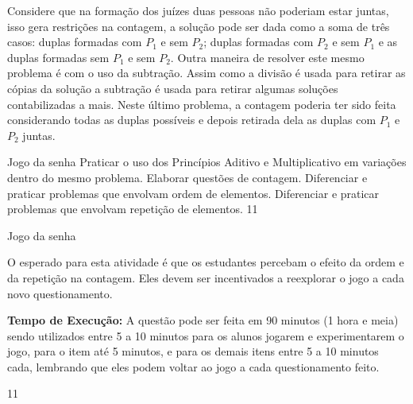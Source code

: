 Considere que na formação dos juízes duas pessoas não poderiam estar juntas, isso gera restrições na contagem, a solução pode ser dada como a soma de três casos: duplas formadas com  $P_1$ e sem $P_2$; duplas formadas com  $P_2$ e sem $P_1$ e as duplas formadas sem $P_1$ e sem $P_2$. Outra maneira de resolver este mesmo problema é com o uso da subtração. Assim como a divisão é usada para retirar as cópias da solução a subtração é usada para retirar algumas soluções contabilizadas a mais. Neste último problema, a contagem poderia ter sido feita considerando todas as duplas possíveis e depois retirada dela as duplas com $P_1$ e $P_2$ juntas. 
\clearpage
\def\currentcolor{session2}
\begin{objectives}{Jogo da senha}
{
Praticar o uso dos Princípios Aditivo e Multiplicativo em variações dentro do mesmo problema. Elaborar questões de contagem. Diferenciar e praticar problemas que envolvam ordem de elementos. Diferenciar e praticar problemas que envolvam repetição de elementos.
}{1}{1}
\end{objectives}
\mspace{-2.25em}
\begin{sugestions}{Jogo da senha}
{
O esperado para esta atividade é que os estudantes percebam o efeito da ordem e da repetição na contagem. Eles devem ser incentivados a reexplorar o jogo a cada novo questionamento.

\textbf{Tempo de Execução:} A questão pode ser feita em 90 minutos (1 hora e meia) sendo utilizados entre 5 a 10 minutos para os alunos jogarem e experimentarem o jogo,  para o item  até 5  minutos, e para os demais itens entre 5 a 10 minutos cada, lembrando que eles podem voltar ao jogo a cada questionamento feito.
}{1}{1}
\end{sugestions}
\mspace{-1.25em}
